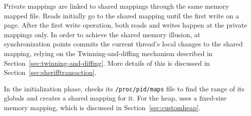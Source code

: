Private mappings are linked to shared mappings through the same memory mapped file. Reads initially go to the shared mapping until the first write on a page. After the first write operation, both reads and writes happen at the private mappings only. In order to achieve the shared memory illusion, at synchronization points \sheriff{} commits the current thread's local changes to the shared mapping, relying on the Twinning-and-diffing mechanism described in Section~\ref{sec:twinning-and-diffing}. More details of this is discussed in Section~\ref{sec:sherifftransaction}.

In the initialization phase, \sheriff{} checks its \texttt{/proc/pid/maps} file to find the range of its globals and creates a shared mapping for it. For the heap, \sheriff{} uses a fixed-size memory mapping, which is discussed in Section~\ref{sec:customheap}. 

